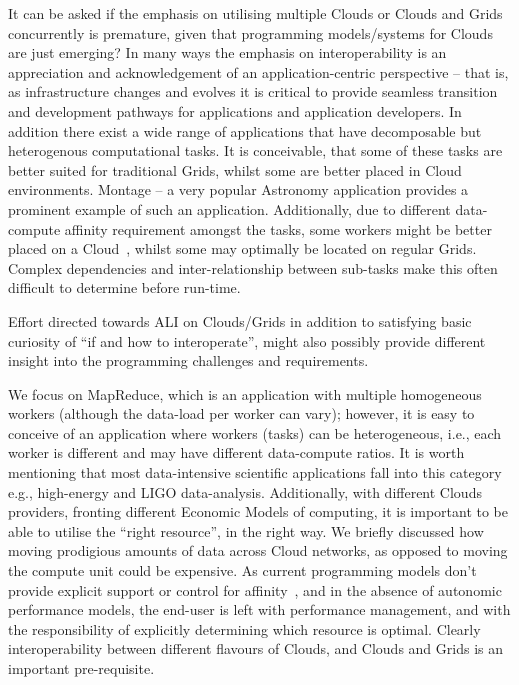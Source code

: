 \documentclass[conference,final]{IEEEtran}
\newcommand{\jhanote}[1]{ {\textcolor{red} { ***SJ: #1 }}}
\newcommand{\jhanote}[1]{}
\begin{document}
It can be asked if the emphasis on utilising multiple Clouds or Clouds
and Grids concurrently is premature, given that programming
models/systems for Clouds are just emerging? In many ways the emphasis
on interoperability is an appreciation and acknowledgement of an
application-centric perspective -- that is, as infrastructure changes
and evolves it is critical to provide seamless transition and
development pathways for applications and application developers. In
addition there exist a wide range of applications that have
decomposable but heterogenous computational tasks. It is conceivable,
that some of these tasks are better suited for traditional Grids,
whilst some are better placed in Cloud environments. Montage -- a very
popular Astronomy application provides a prominent example of such an
application.  Additionally, due to different data-compute affinity
requirement amongst the tasks, some workers might be better placed on
a Cloud~\cite{jha_ccpe09}, whilst some may optimally be located on
regular Grids.  Complex dependencies and inter-relationship between
sub-tasks make this often difficult to determine before run-time.

Effort directed towards ALI on Clouds/Grids in addition to satisfying
basic curiosity of ``if and how to interoperate'', might also possibly
provide different insight into the programming challenges and
requirements.



We focus on MapReduce, which is an application with multiple
homogeneous workers (although the data-load per worker can vary);
however, it is easy to conceive of an application where workers
(tasks) can be heterogeneous, i.e., each worker is different and may
have different data-compute ratios.  It is worth mentioning that most
data-intensive scientific applications fall into this category e.g.,
high-energy and LIGO data-analysis.  Additionally, with different
Clouds providers, fronting different Economic Models of computing, it
is important to be able to utilise the ``right resource'', in the
right way. We briefly discussed how moving prodigious amounts of data
across Cloud networks, as opposed to moving the compute unit could be
expensive.  As current programming models don't provide explicit
support or control for affinity~\cite{jha_ccpe09}, and in the absence
of autonomic performance models, the end-user is left with performance
management, and with the responsibility of explicitly determining
which resource is optimal. Clearly interoperability between different
flavours of Clouds, and Clouds and Grids is an important
pre-requisite.
\end{document}
